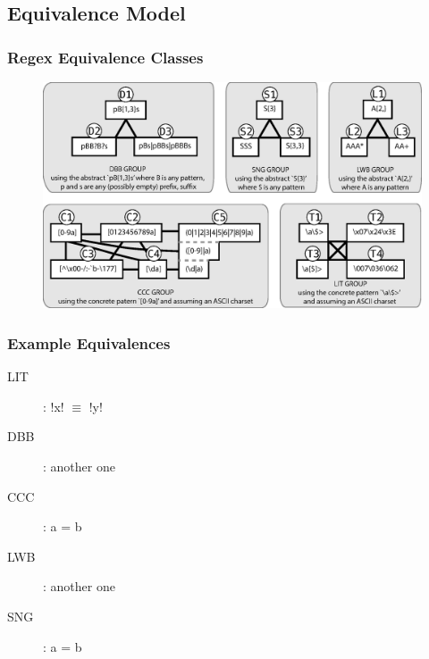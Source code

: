 \subsection{Equivalence Model}


\begin{frame}
\frametitle{Regex Equivalence Classes}
\begin{figure}[h]
  \centering
  \includegraphics[scale=0.45]{nontex/illustrations/refactoringTree.eps}
  \label{fig:refactoringTree}
\end{figure}
\end{frame}



\begin{frame}[fragile]
\frametitle{Example Equivalences}
\begin{description}
\item [LIT]: \cverb!x! $\equiv$ \cverb!y!
\item [DBB]: another one
\item [CCC]: a = b
\item [LWB]: another one
\item [SNG]: a = b
\end{description}
\end{frame}

